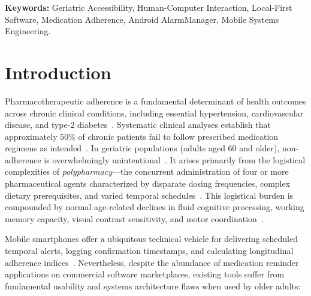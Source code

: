 \documentclass[11pt,a4paper]{article}
\begin{document}
\textbf{Keywords:} Geriatric Accessibility, Human-Computer Interaction, Local-First Software, Medication Adherence, Android AlarmManager, Mobile Systems Engineering.

\section{Introduction}
\label{sec:introduction}

Pharmacotherapeutic adherence is a fundamental determinant of health outcomes across chronic clinical conditions, including essential hypertension, cardiovascular disease, and type-2 diabetes~\cite{who2003adherence,haynes2002helping,osterberg2005adherence,ada2023standards}. Systematic clinical analyses establish that approximately $50\%$ of chronic patients fail to follow prescribed medication regimens as intended~\cite{who2003adherence,morisky1986concurrent}. In geriatric populations (adults aged 60 and older), non-adherence is overwhelmingly unintentional~\cite{fisk2009designing,stronge2007human}. It arises primarily from the logistical complexities of \emph{polypharmacy}---the concurrent administration of four or more pharmaceutical agents characterized by disparate dosing frequencies, complex dietary prerequisites, and varied temporal schedules~\cite{dayer2013smartphone,nau2012proportion}. This logistical burden is compounded by normal age-related declines in fluid cognitive processing, working memory capacity, visual contrast sensitivity, and motor coordination~\cite{kurniawan2008older,trewin2013physical,siek2006fat,wildenbos2018aging}.

Mobile smartphones offer a ubiquitous technical vehicle for delivering scheduled temporal alerts, logging confirmation timestamps, and calculating longitudinal adherence indices~\cite{dayer2013smartphone}. Nevertheless, despite the abundance of medication reminder applications on commercial software marketplaces, existing tools suffer from fundamental usability and systems architecture flaws when used by older adults:
\end{document}
